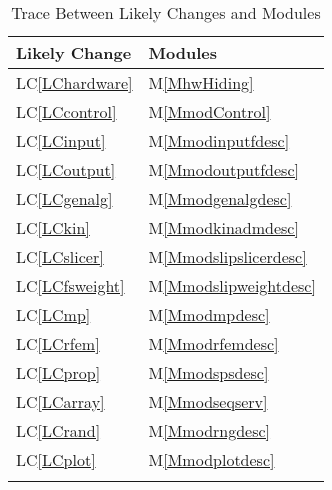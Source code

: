 \documentclass[12pt]{article}
\begin{document}
\begin{longtable}{l l}
\toprule
Likely Change & Modules
\\
\midrule
LC\ref{LChardware} & M\ref{MhwHiding}
\\
LC\ref{LCcontrol} & M\ref{MmodControl}
\\
LC\ref{LCinput} & M\ref{Mmodinputfdesc}
\\
LC\ref{LCoutput} & M\ref{Mmodoutputfdesc}
\\
LC\ref{LCgenalg} & M\ref{Mmodgenalgdesc}
\\
LC\ref{LCkin} & M\ref{Mmodkinadmdesc}
\\
LC\ref{LCslicer} & M\ref{Mmodslipslicerdesc}
\\
LC\ref{LCfsweight} & M\ref{Mmodslipweightdesc}
\\
LC\ref{LCmp} & M\ref{Mmodmpdesc}
\\
LC\ref{LCrfem} & M\ref{Mmodrfemdesc}
\\
LC\ref{LCprop} & M\ref{Mmodspsdesc}
\\
LC\ref{LCarray} & M\ref{Mmodseqserv}
\\
LC\ref{LCrand} & M\ref{Mmodrngdesc}
\\
LC\ref{LCplot} & M\ref{Mmodplotdesc}
\\
\bottomrule
\caption{Trace Between Likely Changes and Modules}
\label{Table:TracBetwLikeChanandModu}
\end{longtable}
\end{document}
